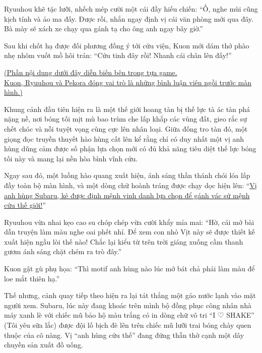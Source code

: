 \documentclass[../main.tex]{subfiles}
\begin{document}
Ryuuhou khẽ tặc lưỡi, nhếch mép cười một cái đầy hiếu chiến: ``Ồ, nghe mùi cũng kịch tính và ảo ma đấy. Được rồi, nhắn ngay định vị cái văn phòng mới qua đây. Bà mày sẽ xách xe chạy qua gánh tạ cho ông anh ngay bây giờ.''

Sau khi chốt hạ được đối phương đồng ý tới cứu viện, Kuon mới dám thở phào nhẹ nhõm vuốt mồ hôi trán: ``Cứu tinh đây rồi! Nhanh cái chân lên đấy!''

\ct

\begin{center}
  \uline{(Phần nội dung dưới đây diễn biến bên trong tựa game.\\Kuon, Ryuuhou và Pekora đóng vai trò là những bình luận viên ngồi trước màn hình.)}
\end{center}


Khung cảnh đầu tiên hiện ra là một thế giới hoang tàn bị thế lực tà ác tàn phá nặng nề, nơi bóng tối mịt mù bao trùm che lấp khắp các vùng đất, gieo rắc sự chết chóc và nỗi tuyệt vọng cùng cực lên nhân loại. Giữa đống tro tàn đó, một giọng đọc truyền thuyết hào hùng cất lên kể rằng chỉ có duy nhất một vị anh hùng dũng cảm được số phận lựa chọn mới có đủ khả năng tiêu diệt thế lực bóng tối này và mang lại nền hòa bình vĩnh cửu.

Ngay sau đó, một luồng hào quang xuất hiện, ánh sáng thần thánh chói lóa lấp đầy toàn bộ màn hình, và một dòng chữ hoành tráng được chạy dọc hiện lên: ``\uline{Vị anh hùng Subaru, kẻ được định mệnh vinh danh lựa chọn để gánh vác sứ mệnh cứu thế giới!}''

\il

Ryuuhou vừa nhai kẹo cao su chóp chép vừa cười khẩy mỉa mai: ``Hờ, cái mở bài dẫn truyện làm màu nghe oai phết nhỉ. Để xem con nhỏ Vịt này sẽ được thiết kế xuất hiện ngầu lòi thế nào! Chắc lại kiểu từ trên trời giáng xuống cầm thanh gươm ánh sáng chặt chém ra trò đây.''

Kuon gật gù phụ họa: ``Thì motif anh hùng nào lúc mở bát chả phải làm màu để loe mắt thiên hạ.''

\il

Thế nhưng, cảnh quay tiếp theo hiện ra lại tát thẳng một gáo nước lạnh vào mặt người xem. Subaru, lúc này đang khoác trên mình bộ đồng phục công nhân nhà máy xanh lè với chiếc mũ bảo hộ màu trắng có in dòng chữ vô tri ``I ♡ SHAKE'' (Tôi yêu sữa lắc) được đội lố bịch đè lên trên chiếc mũ lưỡi trai bóng chày quen thuộc của cô nàng. Vị ``anh hùng cứu thế'' đang đứng thẫn thờ cạnh một dây chuyền sản xuất đồ uống.
\end{document}
